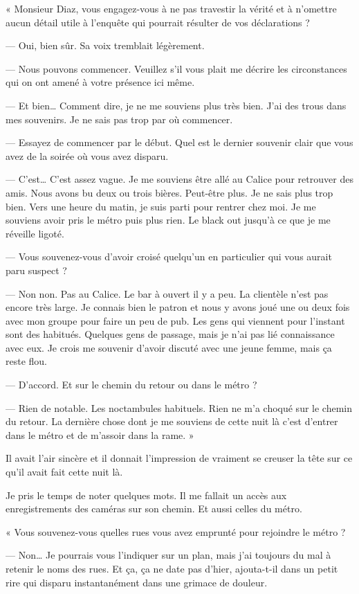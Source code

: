 « Monsieur Diaz, vous engagez-vous à ne pas travestir la vérité et à n'omettre aucun détail utile à l'enquête qui
pourrait résulter de vos déclarations ?

— Oui, bien sûr. Sa voix tremblait légèrement.

— Nous pouvons commencer. Veuillez s'il vous plait me décrire les circonstances qui on ont amené à votre présence ici
même.

— Et bien… Comment dire, je ne me souviens plus très bien. J'ai des trous dans mes souvenirs. Je ne sais pas trop par
où commencer.

— Essayez de commencer par le début. Quel est le dernier souvenir clair que vous avez de la soirée où vous avez disparu.

— C'est… C'est assez vague. Je me souviens être allé au Calice pour retrouver des amis. Nous avons bu deux ou trois
bières. Peut-être plus. Je ne sais plus trop bien. Vers une heure du matin, je suis parti pour rentrer chez moi. Je me
souviens avoir pris le métro puis plus rien. Le black out jusqu'à ce que je me réveille ligoté.

— Vous souvenez-vous d'avoir croisé quelqu'un en particulier qui vous aurait paru suspect ?

— Non non. Pas au Calice. Le bar à ouvert il y a peu. La clientèle n'est pas encore très large. Je connais bien le
patron et nous y avons joué une ou deux fois avec mon groupe pour faire un peu de pub. Les gens qui viennent pour
l'instant sont des habitués. Quelques gens de passage, mais je n'ai pas lié connaissance avec eux. Je crois me souvenir 
d'avoir discuté avec une jeune femme, mais ça reste flou.

— D'accord. Et sur le chemin du retour ou dans le métro ?

— Rien de notable. Les noctambules habituels. Rien ne m'a choqué sur le chemin du retour. La dernière chose dont je me 
souviens de cette nuit là c'est d'entrer dans le métro et de m'assoir dans la rame. »

Il avait l'air sincère et il donnait l'impression de vraiment se creuser la tête sur ce qu'il avait fait cette nuit là.

Je pris le temps de noter quelques mots. Il me fallait un accès aux enregistrements des caméras sur son chemin. Et
aussi celles du métro.

« Vous souvenez-vous quelles rues vous avez emprunté pour rejoindre le métro ?

— Non… Je pourrais vous l'indiquer sur un plan, mais j'ai toujours du mal à retenir le noms des rues. Et ça, ça ne date
pas d'hier, ajouta-t-il dans un petit rire qui disparu instantanément dans une grimace de douleur.

